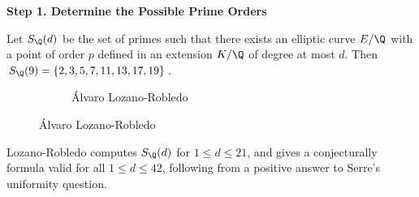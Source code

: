 \begin{frame}[plain]
\vfill
\begin{center} {\bfseries \Large \textcolor{UniGray}{Step 1. Determine the Possible Prime Orders}} \end{center}
\vfill 
\end{frame}



\begin{frame}[plain]
\begin{thm}
Let $S_\Q(d)$ be the set of primes such that there exists an elliptic curve $E/\Q$ with a point of order $p$ defined in an extension $K/\Q$ of degree at most $d$. Then $S_\Q(9)= \{2,3,5,7,11,13,17,19\}$.
\end{thm}
	\begin{figure}[h]
	\centering
	\begin{subfigure}{\textwidth}
	\captionsetup{labelformat=empty}
	\centering
	\caption{\'Alvaro Lozano-Robledo}
	\end{subfigure}
	\end{figure}
\begin{rem}
Lozano-Robledo computes $S_\Q(d)$ for $1 \leq d \leq 21$, and gives a conjecturally formula valid for all $1 \leq d \leq 42$, following from a positive answer to Serre's uniformity question.
\end{rem}
\end{frame}



